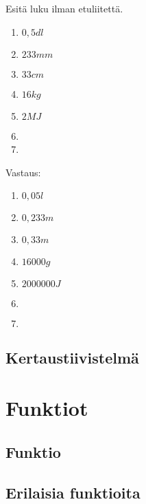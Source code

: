 \begin{tehtava}
Esitä luku ilman etuliitettä.
\begin{enumerate}
\item $0,5 dl$
\item $233 mm$
\item $33 cm$
\item $16 kg$
\item $2 MJ$
\item %
\item 
\end{enumerate}
\begin{vastaus}
Vastaus:
\begin{enumerate}
\item $0,05 l$
\item $0,233 m$
\item $0,33 m$
\item $16 000 g$
\item $2 000 000 J$
\item $ $
\item $ $
\end{enumerate}
\end{vastaus}
\end{tehtava}


\chapter{Kertaustiivistelmä}

\part{Funktiot}
\chapter{Funktio}
\chapter{Erilaisia funktioita}